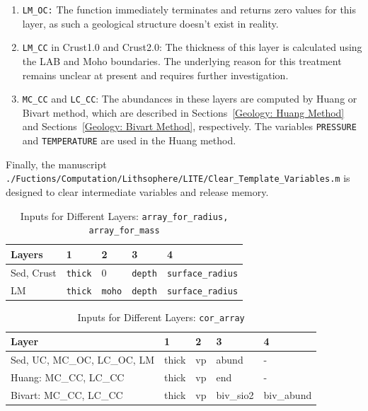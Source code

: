 				\begin{enumerate}
					\item \texttt{LM\_OC:} The function immediately terminates and returns zero values for this layer, as such a geological structure doesn't exist in reality.
					\item \texttt{LM\_CC} in Crust1.0 and Crust2.0: The thickness of this layer is calculated using the LAB and Moho boundaries. The underlying reason for this treatment remains unclear at present and requires further investigation.
					\item \texttt{MC\_CC} and \texttt{LC\_CC}: The abundances in these layers are computed by Huang or Bivart method, which are described in Sections~\ref{Geology: Huang Method} and Sections~\ref{Geology: Bivart Method}, respectively. The variables \texttt{PRESSURE} and \texttt{TEMPERATURE} are used in the Huang method.
				\end{enumerate}
			Finally, the manuscript \texttt{./Fuctions/Computation/Lithsophere/LITE/Clear\_Template\_Variables.m} is designed to clear intermediate variables and release memory.
				\begin{table}[H]
					\centering
					\caption{Inputs for Different Layers: \texttt{array\_for\_radius, array\_for\_mass}}
					\begin{tabular}{p{3cm}|p{2cm}p{2cm}p{2cm}p{3cm}}
						\hline
						\hline
						Layers & 1 & 2 & 3 & 4\\
						\hline
						Sed, Crust & \texttt{thick} & $0$ & \texttt{depth} & \texttt{surface\_radius}\\
						\hline
						LM & \texttt{thick} & \texttt{moho} & \texttt{depth} & \texttt{surface\_radius}\\
						\hline
						\hline
					\end{tabular}
				\end{table}
				\begin{table}[H]
					\centering
					\caption{Inputs for Different Layers: \texttt{cor\_array}}
					\begin{tabular}{p{6cm}|p{2cm}p{2cm}p{2cm}p{2cm}}
						\hline
						\hline
						Layer & 1 & 2 & 3 & 4\\
						\hline
						Sed, UC, MC\_OC, LC\_OC, LM & thick & vp & abund & -\\
						\hline
						Huang: MC\_CC, LC\_CC & thick & vp & end & -\\
						\hline
						Bivart: MC\_CC, LC\_CC & thick & vp & biv\_sio2 & biv\_abund\\
						\hline
						\hline
					\end{tabular}
				\end{table}
